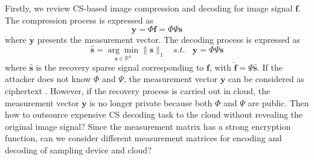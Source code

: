\documentclass[conference]{IEEEtran}
\begin{document}
Firstly, we review CS-based image compression and decoding for image signal $\mathbf{f}$. The compression process is expressed as
\begin{equation}\label{e_cs_enc}
    \mathbf{y}=\Phi \mathbf{f}=\Phi\Psi \mathbf{s}
\end{equation}
where $\mathbf{y}$ presents the measurement vector. The decoding process is expressed as
\begin{equation}\label{e_cs_dec}
   \hat{\mathbf{s}}=\underset{\mathbf{s}\in\mathbb{R}^n}{\arg\min}\|\mathbf{s}\|_1 ~~~~s.t. ~~~~\mathbf{y}=\Phi\Psi \mathbf{s}
\end{equation}
where $\hat{\mathbf{s}}$ is the recovery sparse signal corresponding to $\mathbf{f}$, with $\hat{\mathbf{f}}=\Psi\hat{\mathbf{s}}$.
If the attacker does not know  $\Phi$ and  $\Psi$, the measurement vector $\mathbf{y}$ can be considered as ciphertext  \cite{orsdemir2008security}. However, if the recovery process is carried out in cloud, the measurement vector $\mathbf{y}$ is no longer private  because both  $\Phi$ and $\Psi$ are public.
Then how to outsource expensive CS decoding task to the cloud without revealing the original image signal? Since the measurement matrix has a strong encryption function, can we consider different measurement matrices for encoding and decoding of sampling device and cloud?
\end{document}
